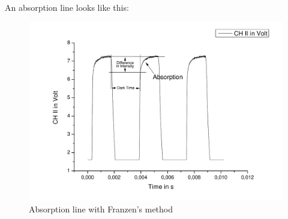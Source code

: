 An absorption line looks like this:

\begin{figure}[H]
\centering \includegraphics[width=\textwidth]{BilderAusw/FranzenBsp.pdf}
\caption{Absorption line with Franzen's method}
\end{figure}






















